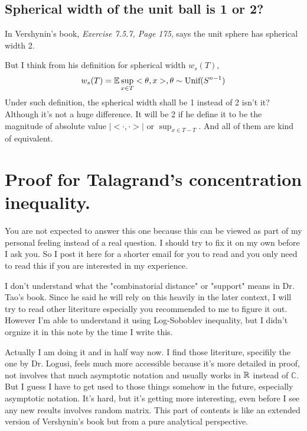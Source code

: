 

\subsection{Spherical width of the unit ball is 1 or 2?}

In Vershynin's book, \textit{Exercise 7.5.7, Page 175}, says the unit sphere has spherical width 2. 

But I think from his definition for spherical width $w_s(T)$,
\begin{equation*}
    w_s(T) = \mathbb{E} \sup_{x\in T} <\theta,x>, \theta \sim \text{Unif}(S^{n-1})
\end{equation*}
Under such definition, the spherical width shall be 1 instead of 2 isn't it? Although it's not a huge difference. It will be 2 if he define it to be the magnitude of absolute value $|<\cdot,\cdot>|$ or $\sup_{x\in T-T}$. And all of them are kind of equivalent.

\section{Proof for Talagrand's concentration inequality.}

You are not expected to answer this one because this can be viewed as part of my personal feeling instead of a real question. 
I should try to fix it on my own before I ask you. 
So I post it here for a shorter email for you to read and you only need to read this if you are interested in my experience. 

I don't understand what the "combinatorial distance" or "support" means in Dr. Tao's book. Since he said he will rely on this heavily in the later context, I will try to read other literiture especially you recommended to me to figure it out. 
However I'm able to understand it using Log-Soboblev inequality, but I didn't orgnize it in this note by the time I write this.

Actually I am doing it and in half way now. I find those literiture, specifily the one by Dr. Logusi, feels much more accessible because it's more detailed in proof, not involves that much asymptotic notation and usually works in $\mathbb{R}$ instead of $\mathbb C$. 
But I guess I have to get used to those things somehow in the future, especially asymptotic notation. It's hard, but it's getting more interesting, even before I see any new results involves random matrix. This part of contents is like an extended version of Vershynin's book but from a pure analytical perspective.